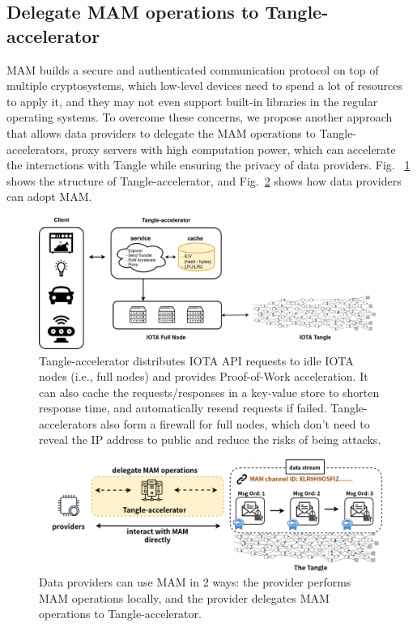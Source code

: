 \begin{spacing}{2.0}
\subsection{Delegate MAM operations to Tangle-accelerator}
\label{section:ta_endpoint}
MAM builds a secure and authenticated communication protocol on top of multiple cryptosystems, which low-level devices need to spend a lot of resources to apply it, and they may not even support built-in libraries in the regular operating systems. To overcome these concerns, we propose another approach that allows data providers to delegate the MAM operations to Tangle-accelerators, proxy servers with high computation power, which can accelerate the interactions with Tangle while ensuring the privacy of data providers. Fig.~ \ref{fig:ta_struct} shows the structure of Tangle-accelerator, and Fig.~\ref{fig:delegation} shows how data providers can adopt MAM.
\clearpage

\begin{figure}[t]
    \centering
    \includegraphics[width=5.5in]{img/ta_structure}
    \caption{Tangle-accelerator distributes IOTA API requests to idle IOTA nodes (i.e., full nodes) and provides Proof-of-Work acceleration. It can also cache the requests/responses in a key-value store to shorten response time, and automatically resend requests if failed. Tangle-accelerators also form a firewall for full nodes, which don't need to reveal the IP address to public and reduce the risks of being attacks.}
    \label{fig:ta_struct}
\end{figure}

\begin{figure}[b]
    \centering
    \includegraphics[width=\linewidth]{img/delegation}
    \caption{Data providers can use MAM in 2 ways: the provider performs MAM operations locally, and the provider delegates MAM operations to Tangle-accelerator.}
    \label{fig:delegation}
\end{figure}
\clearpage


\end{spacing}
